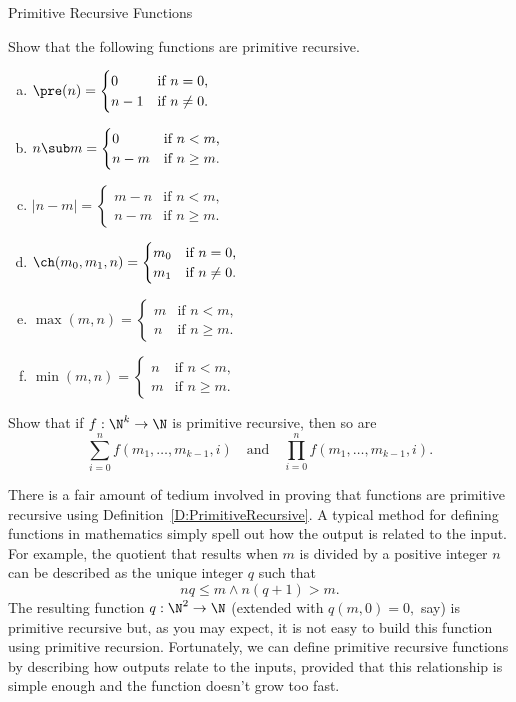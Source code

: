 \begin{unit}{Primitive Recursive Functions}
\noindent
\begin{problem}\label{P:PrimitiveRecursiveBase}
Show that the following functions are primitive recursive.
\begin{enumerate}[(a)]
\item \(\displaystyle \pre(n) = \begin{cases} 0 & \text{if $n = 0$,} \\ n-1 & \text{if $n \neq 0$.} \end{cases}\)
\item \(\displaystyle n \sub m = \begin{cases} 0 & \text{if $n < m$,} \\ n-m & \text{if $n \geq m$.} \end{cases}\)
\item \(\displaystyle |n - m| = \begin{cases} m-n & \text{if $n < m$,} \\ n-m & \text{if $n \geq m$.} \end{cases}\)
\item \(\displaystyle \ch(m_0,m_1,n) = \begin{cases} m_0 & \text{if $n = 0$,} \\ m_1 & \text{if $n \neq 0$.} \end{cases}\)
\item \(\displaystyle \max(m,n) = \begin{cases} m & \text{if $n < m$,} \\ n & \text{if $n \geq m$.} \end{cases}\)
\item \(\displaystyle \min(m,n) = \begin{cases} n & \text{if $n < m$,} \\ m & \text{if $n \geq m$.} \end{cases}\)
\end{enumerate}
\end{problem}

\begin{problem}
  Show that if \(f:\N^k\to\N\) is primitive recursive, then so are \[\sum\limits_{i = 0}^n f(m_1,\dots,m_{k-1},i) \quad\text{and}\quad\prod\limits_{i = 0}^n f(m_1,\dots,m_{k-1},i).\]
\end{problem}

There is a fair amount of tedium involved in proving that functions are primitive recursive using Definition~\ref{D:PrimitiveRecursive}.
A typical method for defining functions in mathematics simply spell out how the output is related to the input.
For example, the quotient that results when \(m\) is divided by a positive integer \(n\) can be described as the unique integer \(q\) such that \[nq \leq m \land n(q+1) > m.\]
The resulting function \(q:\N^2\to\N\) (extended with \(q(m,0) = 0,\) say) is primitive recursive but, as you may expect, it is not easy to build this function using primitive recursion.
Fortunately, we can define primitive recursive functions by describing how outputs relate to the inputs, provided that this relationship is simple enough and the function doesn't grow too fast.


\end{unit}
